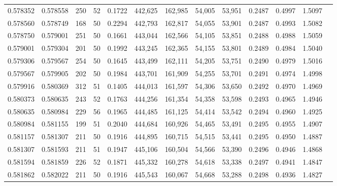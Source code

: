 \begin{tabular}{rrrrrrrrrrrrr}
0.578352 & 0.578558 &   250 &  52 &                                     0.1722 & 442,625 & 162,985 &  54,005 &  53,951 & 0.2487 & 0.4997 & 1.5097 \\
0.578560 & 0.578749 &   168 &  50 &                                     0.2294 & 442,793 & 162,817 &  54,055 &  53,901 & 0.2487 & 0.4993 & 1.5082 \\
0.578750 & 0.579001 &   251 &  50 &                                     0.1661 & 443,044 & 162,566 &  54,105 &  53,851 & 0.2488 & 0.4988 & 1.5059 \\
0.579001 & 0.579304 &   201 &  50 &                                     0.1992 & 443,245 & 162,365 &  54,155 &  53,801 & 0.2489 & 0.4984 & 1.5040 \\
0.579306 & 0.579567 &   254 &  50 &                                     0.1645 & 443,499 & 162,111 &  54,205 &  53,751 & 0.2490 & 0.4979 & 1.5016 \\
0.579567 & 0.579905 &   202 &  50 &                                     0.1984 & 443,701 & 161,909 &  54,255 &  53,701 & 0.2491 & 0.4974 & 1.4998 \\
0.579916 & 0.580369 &   312 &  51 &                                     0.1405 & 444,013 & 161,597 &  54,306 &  53,650 & 0.2492 & 0.4970 & 1.4969 \\
0.580373 & 0.580635 &   243 &  52 &                                     0.1763 & 444,256 & 161,354 &  54,358 &  53,598 & 0.2493 & 0.4965 & 1.4946 \\
0.580635 & 0.580984 &   229 &  56 &                                     0.1965 & 444,485 & 161,125 &  54,414 &  53,542 & 0.2494 & 0.4960 & 1.4925 \\
0.580984 & 0.581155 &   199 &  51 &                                     0.2040 & 444,684 & 160,926 &  54,465 &  53,491 & 0.2495 & 0.4955 & 1.4907 \\
0.581157 & 0.581307 &   211 &  50 &                                     0.1916 & 444,895 & 160,715 &  54,515 &  53,441 & 0.2495 & 0.4950 & 1.4887 \\
0.581307 & 0.581593 &   211 &  51 &                                     0.1947 & 445,106 & 160,504 &  54,566 &  53,390 & 0.2496 & 0.4946 & 1.4868 \\
0.581594 & 0.581859 &   226 &  52 &                                     0.1871 & 445,332 & 160,278 &  54,618 &  53,338 & 0.2497 & 0.4941 & 1.4847 \\
0.581862 & 0.582022 &   211 &  50 &                                     0.1916 & 445,543 & 160,067 &  54,668 &  53,288 & 0.2498 & 0.4936 & 1.4827 \\

\end{tabular}
